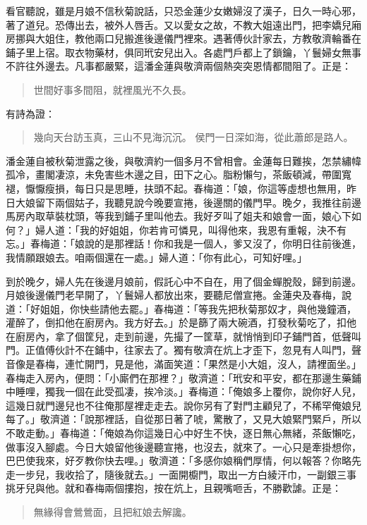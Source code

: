 看官聽說，雖是月娘不信秋菊說話，只恐金蓮少女嫩婦沒了漢子，日久一時心邪，著了道兒。恐傳出去，被外人唇舌。又以愛女之故，不教大姐遠出門，把李嬌兒廂房挪與大姐住，教他兩口兒搬進後邊儀門裡來。遇著傅伙計家去，方教敬濟輪番在鋪子里上宿。取衣物藥材，俱同玳安兒出入。各處門戶都上了鎖鑰，丫鬟婦女無事不許往外邊去。凡事都嚴緊，這潘金蓮與敬濟兩個熱突突恩情都間阻了。正是：
\begin{quote}
世間好事多間阻，就裡風光不久長。
\end{quote}
有詩為證：
\begin{quote}
幾向天台訪玉真，三山不見海沉沉。
侯門一日深如海，從此蕭郎是路人。
\end{quote}

潘金蓮自被秋菊泄露之後，與敬濟約一個多月不曾相會。金蓮每日難挨，怎禁繡幃孤冷，畫閣凄涼，未免害些木邊之目，田下之心。脂粉懶勻，茶飯頓減，帶圍寬褪，懨懨瘦損，每日只是思睡，扶頭不起。春梅道：「娘，你這等虛想也無用，昨日大娘留下兩個姑子，我聽見說今晚要宣捲，後邊關的儀門早。晚夕，我推往前邊馬房內取草裝枕頭，等我到鋪子里叫他去。我好歹叫了姐夫和娘會一面，娘心下如何？」婦人道：「我的好姐姐，你若肯可憐見，叫得他來，我恩有重報，決不有忘。」春梅道：「娘說的是那裡話！你和我是一個人，爹又沒了，你明日往前後進，我情願跟娘去。咱兩個還在一處。」婦人道：「你有此心，可知好哩。」

到於晚夕，婦人先在後邊月娘前，假託心中不自在，用了個金蟬脫殼，歸到前邊。月娘後邊儀門老早開了，丫鬟婦人都放出來，要聽尼僧宣捲。金蓮央及春梅，說道：「好姐姐，你快些請他去罷。」春梅道：「等我先把秋菊那奴才，與他幾鐘酒，灌醉了，倒扣他在廚房內。我方好去。」於是篩了兩大碗酒，打發秋菊吃了，扣他在廚房內，拿了個筐兒，走到前邊，先撮了一筐草，就悄悄到印子鋪門首，低聲叫門。正值傅伙計不在鋪中，往家去了。獨有敬濟在炕上才歪下，忽見有人叫門，聲音像是春梅，連忙開門，見是他，滿面笑道：「果然是小大姐，沒人，請裡面坐。」春梅走入房內，便問：「小廝們在那裡？」敬濟道：「玳安和平安，都在那邊生藥鋪中睡哩，獨我一個在此受孤凄，挨冷淡。」春梅道：「俺娘多上覆你，說你好人兒，這幾日就門邊兒也不往俺那屋裡走走去。說你另有了對門主顧兒了，不稀罕俺娘兒每了。」敬濟道：「說那裡話，自從那日著了唬，驚散了，又見大娘緊門緊戶，所以不敢走動。」春梅道：「俺娘為你這幾日心中好生不快，逐日無心無緒，茶飯懶吃，做事沒入腳處。今日大娘留他後邊聽宣捲，也沒去，就來了。一心只是牽掛想你，巴巴使我來，好歹教你快去哩。」敬濟道：「多感你娘稱們厚情，何以報答？你略先走一步兒，我收拾了，隨後就去。」一面開櫥門，取出一方白綾汗巾，一副銀三事挑牙兒與他。就和春梅兩個摟抱，按在炕上，且親嘴咂舌，不勝歡謔。正是：
\begin{quote}
無緣得會鶯鶯面，且把紅娘去解讒。
\end{quote}

